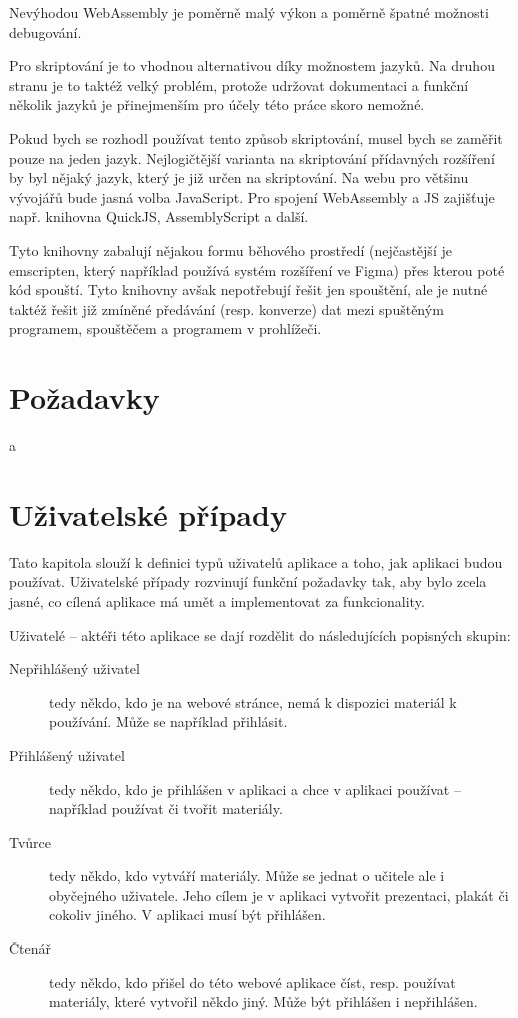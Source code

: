 Nevýhodou WebAssembly je poměrně malý výkon a poměrně špatné možnosti debugování.

Pro skriptování je to vhodnou alternativou díky možnostem jazyků. 
Na druhou stranu je to taktéž velký problém, protože udržovat dokumentaci a funkční několik jazyků je přinejmenším pro účely této práce skoro nemožné.

Pokud bych se rozhodl používat tento způsob skriptování, musel bych se zaměřit pouze na jeden jazyk.
Nejlogičtější varianta na skriptování přídavných rozšíření by byl nějaký jazyk, který je již určen na skriptování.
Na webu pro většinu vývojářů bude jasná volba JavaScript.
Pro spojení WebAssembly a JS zajišťuje např. knihovna QuickJS, AssemblyScript a další.

Tyto knihovny zabalují nějakou formu běhového prostředí (nejčastější je emscripten, který například používá systém rozšíření ve Figma) přes kterou poté kód spouští.
Tyto knihovny avšak nepotřebují řešit jen spouštění, ale je nutné taktéž řešit již zmíněné předávání (resp. konverze) dat mezi spuštěným programem, spouštěčem a programem v prohlížeči.


\section{Požadavky}
a

\section{Uživatelské případy}

Tato kapitola slouží k definici typů uživatelů aplikace a toho, jak aplikaci budou používat.
Uživatelské případy rozvinují funkční požadavky tak, aby bylo zcela jasné, co cílená aplikace má umět a implementovat za funkcionality.

Uživatelé -- aktéři této aplikace se dají rozdělit do následujících popisných skupin:

\begin{description}
    \item[Nepřihlášený uživatel] tedy někdo, kdo je na webové stránce, nemá k dispozici materiál k používání. Může se například přihlásit.
    \item[Přihlášený uživatel] tedy někdo, kdo je přihlášen v aplikaci a chce v aplikaci používat -- například používat či tvořit materiály.
    \item[Tvůrce] tedy někdo, kdo vytváří materiály. Může se jednat o učitele ale i obyčejného uživatele. Jeho cílem je v aplikaci vytvořit prezentaci, plakát či cokoliv jiného. V aplikaci musí být přihlášen.
    \item[Čtenář] tedy někdo, kdo přišel do této webové aplikace číst, resp. používat materiály, které vytvořil někdo jiný. Může být přihlášen i nepřihlášen.
\end{description}

